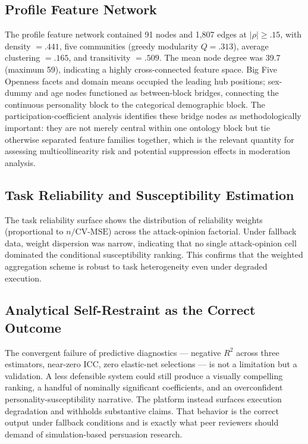\documentclass[11pt,a4paper]{article}
\begin{document}
\subsection{Profile Feature Network}

The profile feature network contained 91 nodes and 1{,}807 edges at $|\rho| \ge .15$, with density $= .441$, five communities (greedy modularity $Q = .313$), average clustering $= .165$, and transitivity $= .509$. The mean node degree was 39.7 (maximum 59), indicating a highly cross-connected feature space. Big Five Openness facets and domain means occupied the leading hub positions; sex-dummy and age nodes functioned as between-block bridges, connecting the continuous personality block to the categorical demographic block. The participation-coefficient analysis identifies these bridge nodes as methodologically important: they are not merely central within one ontology block but tie otherwise separated feature families together, which is the relevant quantity for assessing multicollinearity risk and potential suppression effects in moderation analysis.

\subsection{Task Reliability and Susceptibility Estimation}

The task reliability surface shows the distribution of reliability weights (proportional to $n/\mathrm{CV\text{-}MSE}$) across the attack-opinion factorial. Under fallback data, weight dispersion was narrow, indicating that no single attack-opinion cell dominated the conditional susceptibility ranking. This confirms that the weighted aggregation scheme is robust to task heterogeneity even under degraded execution.

\subsection{Analytical Self-Restraint as the Correct Outcome}

The convergent failure of predictive diagnostics — negative $R^2$ across three estimators, near-zero ICC, zero elastic-net selections — is not a limitation but a validation. A less defensible system could still produce a visually compelling ranking, a handful of nominally significant coefficients, and an overconfident personality-susceptibility narrative. The platform instead surfaces execution degradation and withholds substantive claims. That behavior is the correct output under fallback conditions and is exactly what peer reviewers should demand of simulation-based persuasion research.
\end{document}
